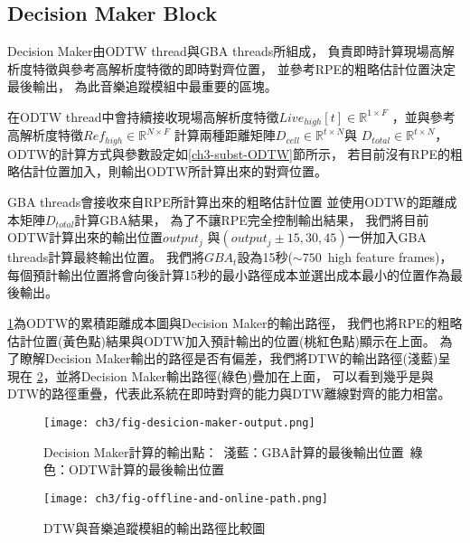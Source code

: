 \documentclass[class=NCU_thesis, crop=false]{standalone}
\begin{document}

\subsection{Decision Maker Block} \label{ch3-subst-decision-maker}
Decision Maker由ODTW thread與GBA threads所組成，
負責即時計算現場高解析度特徵與參考高解析度特徵的即時對齊位置，
並參考RPE的粗略估計位置決定最後輸出，
為此音樂追蹤模組中最重要的區塊。

在ODTW thread中會持續接收現場高解析度特徵$Live_{high}[t] \in \mathbb{R}^{1 \times F}$
，並與參考高解析度特徵$Ref_{high} \in \mathbb{R}^{N \times F}$
計算兩種距離矩陣$D_{cell} \in \mathbb{R}^{t \times N}$與
$D_{total} \in \mathbb{R}^{t \times N}$，
ODTW的計算方式與參數設定如\ref{ch3-subst-ODTW}節所示，
若目前沒有RPE的粗略估計位置加入，則輸出ODTW所計算出來的對齊位置。

GBA threads會接收來自RPE所計算出來的粗略估計位置
並使用ODTW的距離成本矩陣$D_{total}$計算GBA結果，
為了不讓RPE完全控制輸出結果，
我們將目前ODTW計算出來的輸出位置$output_j$
與$(output_j\pm 15, 30, 45)$一併加入GBA threads計算最終輸出位置。
我們將$GBA_{t}$設為15秒($\sim 750$\ high feature frames)，
每個預計輸出位置將會向後計算15秒的最小路徑成本並選出成本最小的位置作為最後輸出。

\cref{fig:fig-ch3-desicion-maker-output}為ODTW的累積距離成本圖與Decision Maker的輸出路徑，
我們也將RPE的粗略估計位置(黃色點)結果與ODTW加入預計輸出的位置(桃紅色點)顯示在上面。
為了瞭解Decision Maker輸出的路徑是否有偏差，我們將DTW的輸出路徑(淺藍)呈現在
\cref{fig:fig-ch3-offline-and-online-path}，並將Decision Maker輸出路徑(綠色)疊加在上面，
可以看到幾乎是與DTW的路徑重疊，代表此系統在即時對齊的能力與DTW離線對齊的能力相當。
\begin{figure}[H]
    \centering
    \texttt{[image: ch3/fig-desicion-maker-output.png]}
    \caption{Decision Maker計算的輸出點：\ 淺藍：GBA計算的最後輸出位置\ 綠色：ODTW計算的最後輸出位置}
    \label{fig:fig-ch3-desicion-maker-output}
\end{figure}
\begin{figure}[H]
    \centering
    \texttt{[image: ch3/fig-offline-and-online-path.png]}
    \caption{DTW與音樂追蹤模組的輸出路徑比較圖}
    \label{fig:fig-ch3-offline-and-online-path}
\end{figure}


\pagebreak
\end{document}
